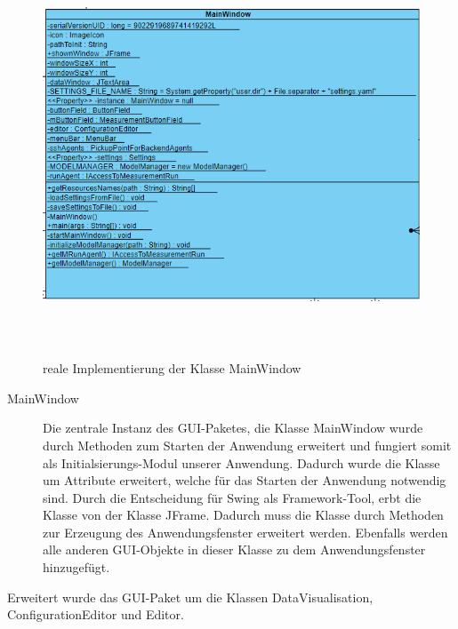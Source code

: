 \documentclass[parskip=full]{scrartcl}
\begin{document}
\begin{figure}[htbp]
    \begin{center}
        \includegraphics[height = 12cm]{Grafiken/MainWindow.png}
        \caption{reale Implementierung der Klasse MainWindow}
        \label{main}
    \end{center}
\end{figure}


\begin{description}
\item[MainWindow] Die zentrale Instanz des GUI-Paketes, die Klasse MainWindow wurde durch Methoden zum Starten der Anwendung erweitert und fungiert somit als Initialsierungs-Modul unserer Anwendung. Dadurch wurde die Klasse um Attribute erweitert, welche für das Starten der Anwendung notwendig sind. Durch die Entscheidung für Swing als Framework-Tool, erbt die Klasse von der Klasse JFrame. Dadurch muss die Klasse durch Methoden zur Erzeugung des Anwendungsfenster erweitert werden. Ebenfalls werden alle anderen GUI-Objekte in dieser Klasse zu dem Anwendungsfenster hinzugefügt. 
\end{description}

Erweitert wurde das GUI-Paket um die Klassen DataVisualisation, ConfigurationEditor und Editor.
\end{document}
